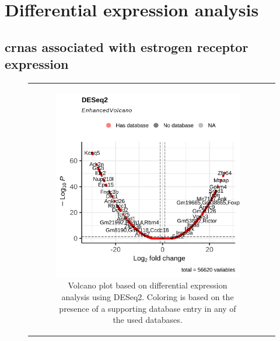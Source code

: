 \section{Differential expression analysis}

\subsection{\Glspl{crna} associated with estrogen receptor expression}

\begin{figure}[H] \begin{tabular}{cc}
        \begin{subfigure}{0.5\textwidth} \centering

            \includegraphics[width=\linewidth]{chapters/4_results_and_discussion/figures/dea/deseq2/esr1/volcano.png}
            \caption{Volcano plot based on differential expression analysis
                using DESeq2.
                Coloring is based on the presence of a supporting database entry in any of the
                used databases.
            } \label{fig:esr1_volcano} \end{subfigure}
        \begin{subfigure}{0.5\textwidth} \centering


\end{subfigure}
\end{tabular}
\end{figure}
